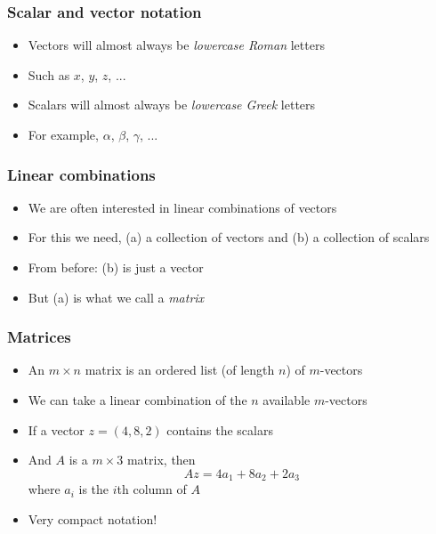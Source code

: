 \documentclass{beamer}
\begin{document}
    \begin{frame}
        \frametitle{Scalar and vector notation}
        \begin{itemize}\itemsep=12pt
            \item Vectors will almost always be \emph{lowercase Roman} letters
            \item Such as $x$, $y$, $z$, ...
            \item Scalars will almost always be \emph{lowercase Greek} letters
            \item For example, $\alpha$, $\beta$, $\gamma$, ...
        \end{itemize}
    \end{frame}

    \begin{frame}
        \frametitle{Linear combinations}
        \begin{itemize}\itemsep=12pt
            \item We are often interested in linear combinations of vectors
            \item For this we need, (a) a collection of vectors and (b) a collection of scalars
            \pause
            \item From before: (b) is just a vector
            \pause
            \item But (a) is what we call a \emph{matrix}
        \end{itemize}
    \end{frame}

    \begin{frame}
        \frametitle{Matrices}
        \begin{itemize}\itemsep=12pt
            \item An $m \times n$ matrix is an ordered list (of length $n$) of $m$-vectors
            \pause
            \item We can take a linear combination of the $n$ available $m$-vectors
            \pause
            \item If a vector $z=(4, 8, 2)$ contains the scalars
            \item And $A$ is a $m \times 3$ matrix, then
            \[
                Az = 4a_1 + 8a_2 + 2a_3
            \]
            where $a_i$ is the $i$th column of $A$
            \pause
            \item Very compact notation!
        \end{itemize}
    \end{frame}
\end{document}

